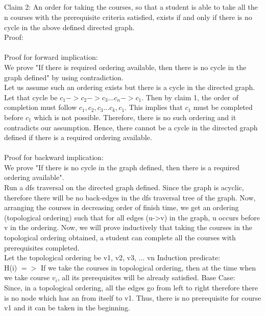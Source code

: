 \documentclass{article}
\begin{document}
\subsection{}
Claim 2: An order for taking the courses, so that a student is able to take all the n courses with the prerequisite criteria satisfied, exists if and only if there is no cycle in the above defined directed graph.\\
Proof:\\
\\Proof for forward implication:
\\We prove "If there is required ordering available, then there is no cycle in the graph defined" by using contradiction.
\\Let us assume such an ordering exists but there is a cycle in the directed graph. Let that cycle be $c_1->c_2->c_3...c_n->c_1$. Then by claim 1, the order of completion must follow $c_1, c_2, c_3...c_k, c_1$. This implies that $c_1$ must be completed before $c_1$ which is not possible. Therefore, there is no such ordering and it contradicts our assumption. Hence, there cannot be a cycle in the directed graph defined if there is a required ordering available.
\\
\\Proof for backward implication:
\\We prove "If there is no cycle in the graph defined, then there is a required ordering available".
\\Run a dfs traversal on the directed graph defined. Since the graph is acyclic, therefore there will be no back-edges in the dfs traversal tree of the graph. Now, arranging the courses in decreasing order of finish time, we get an ordering (topological ordering) such that for all edges (u->v) in the graph, u occurs before v in the ordering. Now, we will prove inductively that taking the courses in the topological ordering obtained, a student can complete all the courses with prerequisites completed.
\\
Let the topological ordering be v1, v2, v3, ... vn
Induction predicate:\\
H(i) $=>$ If we take the courses in topological ordering, then at the time when we take course $v_i$, all its prerequisites will be already satisfied.
Base Case:\\
Since, in a topological ordering, all the edges go from left to right therefore there is no node which has an from itself to v1. Thus, there is no prerequisite for course v1 and it can be taken in the beginning.\\
\end{document}
